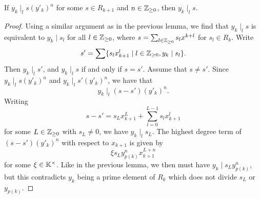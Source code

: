 \begin{lemma}\label{lem:y_divides_sy_prime}
	If $y_k \mid_l s (y'_k)^n$ for some $s \in R_{k+1}$ and $n \in \mathbb{Z}_{\geq 0}$, then
	$y_k \mid_l s$.
\end{lemma}
\begin{proof}
	Using a similar argument as in the previous lemma, we find that $y_k \mid_l s$ is
	equivalent to $y_k \mid s_l$ for all $l \in \mathbb{Z}_{\geq 0}$, where $s = \sum_{l \in
			\mathbb{Z}_{\geq 0 }} s_l x^{k+l}$ for $s_l \in R_k$. Write
	\begin{equation*}
		s' = \sum \{s_l x_{k+1}^l \mid l \in \mathbb{Z}_{\geq 0}, y_k \mid s_l\}.
	\end{equation*}
	Then $y_k \mid_l s'$, and $y_k \mid_l s$ if and only if $s = s'$. Assume that $s \neq
		s'$. Since $y_k \mid_l s (y'_k)^n$ and $y_k \mid_l s' (y'_k)^n$, we have that
	\begin{equation*}
		y_k \mid_l (s - s') (y'_k)^n.
	\end{equation*}
	Writing
	\begin{equation*}
		s - s' = s_L x^L_{k+1} + \sum_{l=0}^{L-1}s_l x_{k+1}^l
	\end{equation*}
	for some $L \in \mathbb{Z}_{\geq 0}$ with $s_L \neq 0$, we have $y_k \mid_l s_L$. The highest
	degree term of $(s-s')(y'_k)^n$ with respect to $x_{k+1}$ is given by
	\begin{equation*}
		\xi s_L y_{p(k)}^n x_{k+1}^{L+n}
	\end{equation*}
	for some $\xi \in \mathbb{K}^\times$. Like in the previous lemma, we then must have $y_k \mid
		s_L y^n_{p(k)}$, but this contradicts $y_k$ being a prime element of $R_k$ which does
	not divide $s_L$ or $y_{p(k)}$.
\end{proof}

